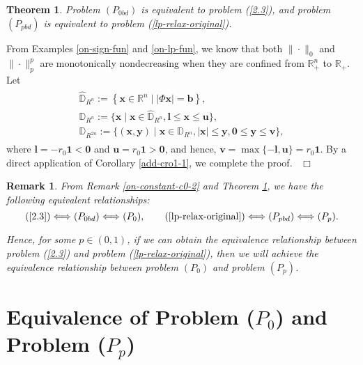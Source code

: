 \documentclass[12pt]{article}
\newtheorem{Theorem}{Theorem}[part]
\newtheorem{Remark}{Remark}[part]
\def \ep{\hbox{ }\hfill$\Box$}
\begin{document}
\begin{Theorem}\label{eqivalent-forms-of-p0-contain-bounds}
 Problem $ (P_{0bd})$ is equivalent to  problem {\rm (\ref{2.3})}, and problem $(P_{pbd})$ is equivalent to  problem {\rm (\ref{lp-relax-original})}.
\end{Theorem}

From Examples \ref{on-sign-fun} and \ref{on-lp-fun}, we know that both $\|\cdot\|_{0}$  and $\|\cdot\|_{p}^{p}$ are monotonically nondecreasing when they are confined from $\mathbb{R}^{n}_{+}$ to $\mathbb{R}_{+}$. Let
\begin{eqnarray*}
\begin{array}{l}
\hat{\mathbb{D}}_{R^{n}}:=\left\{\mathbf{x}\in\mathbb{R}^{n}\;\Big|\;|\Phi\mathbf{x}|=\mathbf{b}\right\},\\
\mathbb{D}_{R^{n}}:=\{\mathbf{x}\mid\mathbf{x}\in \hat{\mathbb{D}}_{R^n},\mathbf{l}\leqslant \mathbf{x}\leqslant \mathbf{u}\}, \\
\mathbb{D}_{R^{2n}}:=\{(\mathbf{x}, \mathbf{y})\mid\mathbf{x}\in \mathbb{D}_{R^{n}}, |\mathbf{x}|\leqslant \mathbf{y}, \mathbf{0}\leqslant \mathbf{y} \leqslant \mathbf{v}\},
\end{array}
\end{eqnarray*}
where $\mathbf{l}=- r_0\mathbf{1}<\mathbf{0}$ and $\mathbf{u}=r_0\mathbf{1}>\mathbf{0}$, and hence,
$\mathbf{v}=\max\{-\mathbf{l},\mathbf{u}\}=r_0\mathbf{1}$. By a direct application of Corollary \ref{add-cro1-1}, we complete the proof.
\ep

\begin{Remark}\label{all-equivalences}
From Remark \ref{on-constant-c0-2} and Theorem \ref{eqivalent-forms-of-p0-contain-bounds}, we have the following equivalent relationships:
$$
 {\rm (\ref{2.3})} \Longleftrightarrow(P_{0bd})\Longleftrightarrow(P_{0}),\qquad  {\rm (\ref{lp-relax-original})}\Longleftrightarrow(P_{pbd})\Longleftrightarrow(P_{p}).
$$

\noindent Hence, for some $p\in (0,1)$, if we can obtain the equivalence relationship between problem {\rm (\ref{2.3})} and problem {\rm (\ref{lp-relax-original})}, then we will achieve the equivalence relationship between problem $(P_{0})$ and problem $(P_{p})$.
\end{Remark}




\section{Equivalence of Problem ($P_0$) and Problem ($P_p$)}
\setcounter{equation}{0} \setcounter{Assumption}{0}
\setcounter{Theorem}{0} \setcounter{Proposition}{0}
\setcounter{Corollary}{0} \setcounter{Lemma}{0}
\setcounter{Definition}{0} \setcounter{Remark}{0}
\setcounter{Algorithm}{0} \setcounter{Example}{0}
\end{document}
